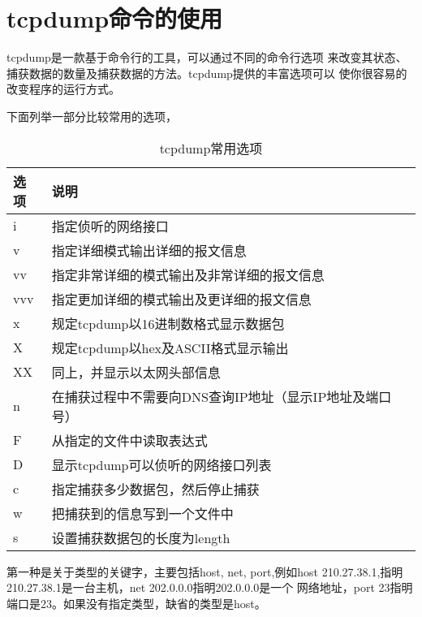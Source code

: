 \section{tcpdump命令的使用}
\label{sec:tcpdumpCmd}

tcpdump是一款基于命令行的工具，可以通过不同的命令行选项
来改变其状态、捕获数据的数量及捕获数据的方法。tcpdump提供的丰富选项可以
使你很容易的改变程序的运行方式。

下面列举一部分比较常用的选项，

\begin{table}[!htbp]
  \centering
  \caption{tcpdump常用选项}
  \label{tab:tcpdumpOptions}
  \begin{tabular}{ll}
    \toprule
    选项     & 说明 \\
    \midrule
    i     & 指定侦听的网络接口 \\
    v     & 指定详细模式输出详细的报文信息 \\
    vv    & 指定非常详细的模式输出及非常详细的报文信息 \\
    vvv   & 指定更加详细的模式输出及更详细的报文信息 \\
    x     & 规定tcpdump以16进制数格式显示数据包 \\
    X     & 规定tcpdump以hex及ASCII格式显示输出 \\
    XX    & 同上，并显示以太网头部信息 \\
    n     & 在捕获过程中不需要向DNS查询IP地址（显示IP地址及端口号） \\
    F     & 从指定的文件中读取表达式 \\
    D     & 显示tcpdump可以侦听的网络接口列表 \\
    c     & 指定捕获多少数据包，然后停止捕获 \\
    w     & 把捕获到的信息写到一个文件中 \\
    s     & 设置捕获数据包的长度为length \\
    \bottomrule
  \end{tabular}
\end{table}

第一种是关于类型的关键字，主要包括host, net, port,例如host
210.27.38.1,指明210.27.38.1是一台主机，net 202.0.0.0指明202.0.0.0是一个
网络地址，port 23指明端口是23。如果没有指定类型，缺省的类型是host。

